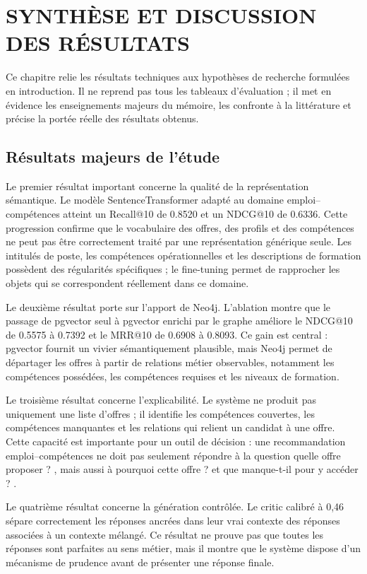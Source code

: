 \documentclass[12pt,twoside]{report}
\begin{document}
\chapter{SYNTHÈSE ET DISCUSSION DES RÉSULTATS}

Ce chapitre relie les résultats techniques aux hypothèses de recherche formulées en introduction. Il ne reprend pas tous les tableaux d'évaluation ; il met en évidence les enseignements majeurs du mémoire, les confronte à la littérature et précise la portée réelle des résultats obtenus.

\section{Résultats majeurs de l'étude}

Le premier résultat important concerne la qualité de la représentation sémantique. Le modèle SentenceTransformer adapté au domaine emploi--compétences atteint un Recall@10 de 0.8520 et un NDCG@10 de 0.6336. Cette progression confirme que le vocabulaire des offres, des profils et des compétences ne peut pas être correctement traité par une représentation générique seule. Les intitulés de poste, les compétences opérationnelles et les descriptions de formation possèdent des régularités spécifiques ; le fine-tuning permet de rapprocher les objets qui se correspondent réellement dans ce domaine.

Le deuxième résultat porte sur l'apport de Neo4j. L'ablation montre que le passage de pgvector seul à pgvector enrichi par le graphe améliore le NDCG@10 de 0.5575 à 0.7392 et le MRR@10 de 0.6908 à 0.8093. Ce gain est central : pgvector fournit un vivier sémantiquement plausible, mais Neo4j permet de départager les offres à partir de relations métier observables, notamment les compétences possédées, les compétences requises et les niveaux de formation.

Le troisième résultat concerne l'explicabilité. Le système ne produit pas uniquement une liste d'offres ; il identifie les compétences couvertes, les compétences manquantes et les relations qui relient un candidat à une offre. Cette capacité est importante pour un outil de décision : une recommandation emploi--compétences ne doit pas seulement répondre à la question \og quelle offre proposer ? \fg{}, mais aussi à \og pourquoi cette offre ? \fg{} et \og que manque-t-il pour y accéder ? \fg{}.

Le quatrième résultat concerne la génération contrôlée. Le critic calibré à 0,46 sépare correctement les réponses ancrées dans leur vrai contexte des réponses associées à un contexte mélangé. Ce résultat ne prouve pas que toutes les réponses sont parfaites au sens métier, mais il montre que le système dispose d'un mécanisme de prudence avant de présenter une réponse finale.
\end{document}
